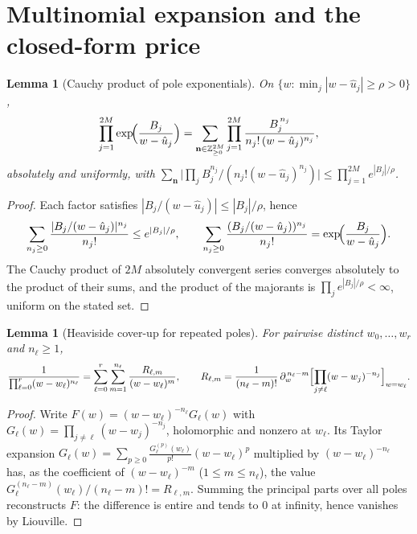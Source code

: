 \documentclass[11pt]{article}
\newtheorem{lemma}[theorem]{Lemma}
\newcommand{\Z}{\mathbb{Z}}
\begin{document}
\section{Multinomial expansion and the closed-form price}\label{sec:price}

\begin{lemma}[Cauchy product of pole exponentials]\label{lem:cauchy}
On $\{w:\min_j|w-\hat u_j|\ge\rho>0\}$,
\begin{equation}\label{eq:cauchy}
\prod_{j=1}^{2M}\exp\!\Bigl(\frac{B_j}{w-\hat u_j}\Bigr)
=\sum_{\mathbf n\in\Z_{\ge0}^{2M}}\prod_{j=1}^{2M}
\frac{B_j^{\,n_j}}{n_j!\,(w-\hat u_j)^{n_j}},
\end{equation}
absolutely and uniformly, with $\sum_{\mathbf n}\bigl|\prod_j B_j^{n_j}/
(n_j!(w-\hat u_j)^{n_j})\bigr|\le\prod_{j=1}^{2M}e^{|B_j|/\rho}$.
\end{lemma}

\begin{proof}
Each factor satisfies $|B_j/(w-\hat u_j)|\le|B_j|/\rho$, hence
\begin{equation}\label{eq:cauchy-pf}
\sum_{n_j\ge0}\frac{|B_j/(w-\hat u_j)|^{n_j}}{n_j!}\le e^{|B_j|/\rho},
\qquad
\sum_{n_j\ge0}\frac{(B_j/(w-\hat u_j))^{n_j}}{n_j!}
=\exp\!\Bigl(\frac{B_j}{w-\hat u_j}\Bigr).
\end{equation}
The Cauchy product of $2M$ absolutely convergent series converges absolutely
to the product of their sums, and the product of the majorants is
$\prod_j e^{|B_j|/\rho}<\infty$, uniform on the stated set.
\end{proof}

\begin{lemma}[Heaviside cover-up for repeated poles]\label{lem:heav}
For pairwise distinct $w_0,\dots,w_r$ and $n_\ell\ge1$,
\begin{equation}\label{eq:heav}
\frac{1}{\prod_{\ell=0}^r(w-w_\ell)^{n_\ell}}
=\sum_{\ell=0}^r\sum_{m=1}^{n_\ell}\frac{R_{\ell,m}}{(w-w_\ell)^{m}},
\qquad
R_{\ell,m}=\frac{1}{(n_\ell-m)!}\,\partial_w^{\,n_\ell-m}
\Bigl[\prod_{j\neq\ell}(w-w_j)^{-n_j}\Bigr]_{w=w_\ell}.
\end{equation}
\end{lemma}

\begin{proof}
Write $F(w)=(w-w_\ell)^{-n_\ell}G_\ell(w)$ with
$G_\ell(w)=\prod_{j\neq\ell}(w-w_j)^{-n_j}$, holomorphic and nonzero at
$w_\ell$. Its Taylor expansion $G_\ell(w)=\sum_{p\ge0}
\frac{G_\ell^{(p)}(w_\ell)}{p!}(w-w_\ell)^p$ multiplied by
$(w-w_\ell)^{-n_\ell}$ has, as the coefficient of $(w-w_\ell)^{-m}$
($1\le m\le n_\ell$), the value $G_\ell^{(n_\ell-m)}(w_\ell)/(n_\ell-m)!
=R_{\ell,m}$. Summing the principal parts over all poles reconstructs $F$:
the difference is entire and tends to $0$ at infinity, hence vanishes by
Liouville.
\end{proof}
\end{document}
